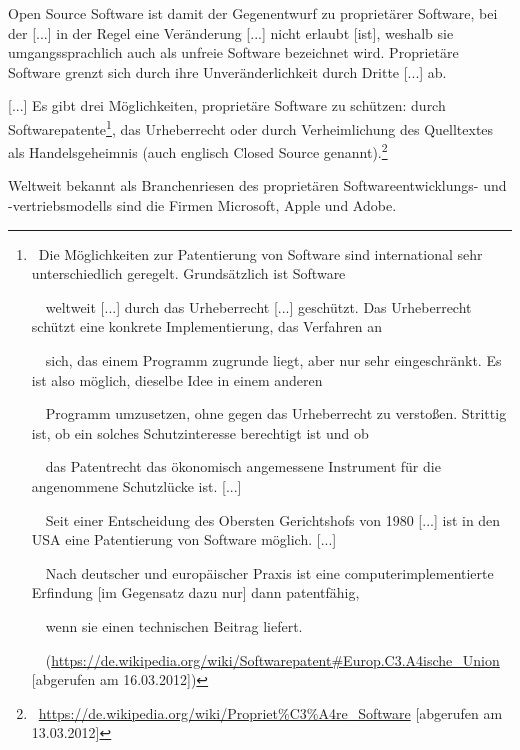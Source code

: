 \documentclass[a4paper]{article}
\newcommand\textstyleInternetlink[1]{\foreignlanguage{english}{\textcolor[rgb]{0.0,0.0,0.5019608}{#1}}}
\begin{document}
\bigskip

{
Open Source Software ist damit der Gegenentwurf zu propriet\"arer
Software, bei der {\guillemotright} [...] in der Regel eine
Ver\"anderung [...] nicht erlaubt [ist], weshalb sie umgangssprachlich
auch als unfreie Software bezeichnet wird. Propriet\"are Software
grenzt sich durch ihre Unver\"anderlichkeit durch Dritte [...] ab.}

{
[...] Es gibt drei M\"oglichkeiten, propriet\"are Software zu
sch\"utzen: durch Softwarepatente\footnote{\ {\guillemotright}Die
M\"oglichkeiten zur Patentierung von Software sind international sehr
unterschiedlich geregelt. Grunds\"atzlich ist Software\par \ \ weltweit
[...] durch das Urheberrecht [...] gesch\"utzt. Das Urheberrecht
sch\"utzt eine konkrete Implementierung, das Verfahren an\par \ \ sich,
das einem Programm zugrunde liegt, aber nur sehr eingeschr\"ankt. Es
ist also m\"oglich, dieselbe Idee in einem anderen\par \ \ Programm
umzusetzen, ohne gegen das Urheberrecht zu versto{\ss}en. Strittig ist,
ob ein solches Schutzinteresse berechtigt ist und ob\par \ \ das
Patentrecht das \"okonomisch angemessene Instrument f\"ur die
angenommene Schutzl\"ucke ist. [...]\par \ \ Seit einer Entscheidung
des Obersten Gerichtshofs von 1980 [...] ist in den USA eine
Patentierung von Software m\"oglich. [...]\par \ \ Nach deutscher und
europ\"aischer Praxis ist eine computerimplementierte Erfindung [im
Gegensatz dazu nur] dann patentf\"ahig,\par \ \ wenn sie einen
technischen Beitrag liefert.{\guillemotleft}\par
\ \ (\href{https://de.wikipedia.org/wiki/Softwarepatent\#Europ.C3.A4ische_Union}{\textstyleInternetlink{https://de.wikipedia.org/wiki/Softwarepatent\#Europ.C3.A4ische\_Union}}
[abgerufen am 16.03.2012])}, das Urheberrecht oder durch Verheimlichung
des Quelltextes als Handelsgeheimnis (auch englisch Closed Source
genannt).{\guillemotleft}\footnote{\ \href{https://de.wikipedia.org/wiki/Propriet?re_Software}{\textstyleInternetlink{https://de.wikipedia.org/wiki/Propriet\%C3\%A4re\_Software}}
[abgerufen am 13.03.2012]}}

{
Weltweit bekannt als Branchenriesen des propriet\"aren
Softwareentwicklungs- und {}-vertriebsmodells sind die Firmen
Microsoft, Apple und Adobe.}
\end{document}
